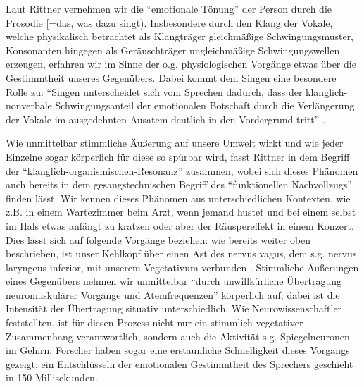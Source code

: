 Laut Rittner vernehmen wir die "`emotionale Tönung"' der Person durch die Prosodie [=das, was dazu singt). Insbesondere durch den Klang der Vokale, welche physikalisch betrachtet als Klangträger gleichmäßige Schwingungsmuster, Konsonanten hingegen als Geräuschträger ungleichmäßige Schwingungswellen erzeugen, erfahren wir im Sinne der o.g. physiologischen Vorgänge etwas über die Gestimmtheit unseres Gegenübers. Dabei kommt dem Singen eine besondere Rolle zu: "`Singen unterscheidet sich vom Sprechen dadurch, dass der klanglich-nonverbale Schwingungsanteil der emotionalen Botschaft durch die Verlängerung der Vokale im ausgedehnten Ausatem deutlich in den Vordergrund tritt"' \autocite[205]{rittner2008}.

Wie unmittelbar stimmliche Äußerung auf unsere Umwelt wirkt und wie jeder Einzelne sogar körperlich für diese so spürbar wird, fasst Rittner in dem Begriff der "`klanglich-organismischen-Resonanz"' zusammen, wobei sich dieses Phänomen auch bereits in dem gesangstechnischen Begriff des "`funktionellen Nachvollzugs"' finden lässt. Wir kennen dieses Phänomen aus unterschiedlichen Kontexten, wie z.B. in einem Wartezimmer beim Arzt, wenn jemand hustet und bei einem selbst im Hals etwas anfängt zu kratzen oder aber der Räuspereffekt in einem Konzert. Dies lässt sich auf folgende Vorgänge beziehen: wie bereits weiter oben beschrieben, ist unser Kehlkopf über einen Ast des nervus vagus, dem s.g. nervus laryngeus inferior, mit unserem Vegetativum verbunden \autocite[vgl.][106]{rittner1990}. Stimmliche Äußerungen eines Gegenübers nehmen wir unmittelbar "`durch unwillkürliche Übertragung neuromuskulärer Vorgänge und Atemfrequenzen"' \autocite[482]{rittner2009a} körperlich auf; dabei ist die Intensität der Übertragung situativ unterschiedlich. Wie Neurowissenschaftler feststellten, ist für diesen Prozess nicht nur ein stimmlich-vegetativer Zusammenhang verantwortlich, sondern auch die Aktivität s.g. Spiegelneuronen im Gehirn. Forscher haben sogar eine erstaunliche Schnelligkeit dieses Vorgangs gezeigt: ein Entschlüsseln der emotionalen Gestimmtheit des Sprechers geschieht in 150 Millisekunden\autocite[vgl.][482]{rittner2009a}.

